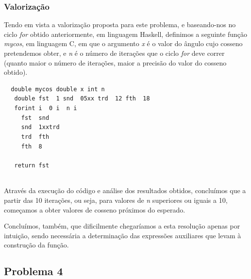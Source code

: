 \documentclass[a4paper]{article}
\begin{document}
\subsubsection*{Valorização}
\par\noindent\hspace{0.5cm}Tendo em vista a valorização proposta para este problema, e baseando-nos no ciclo \textit{for} obtido anteriormente, em linguagem Haskell, definimos a seguinte função \textit{mycos}, em linguagem C, em que o argumento \textit{x} é o valor do ângulo cujo cosseno pretendemos obter, e \textit{n} é o número de iterações que o ciclo \textit{for} deve correr (quanto maior o número de iterações, maior a precisão do valor do cosseno obtido).
\begin{tabbing}\tt
~double~mycos~double~x~int~n\\
\tt ~~~double~fst~~1~snd~~05xx~trd~~12~fth~~18\\
\tt ~~~forint~i~~0~i~~n~i\\
\tt ~~~~~fst~~snd\\
\tt ~~~~~snd~~1xxtrd\\
\tt ~~~~~trd~~fth\\
\tt ~~~~~fth~~8\\
\tt ~~~\\
\tt ~~~return~fst\\
\tt ~
\end{tabbing}
\par\noindent\hspace{0.5cm}Através da execução do código e análise dos resultados obtidos, concluímos que a partir das 10 iterações, ou seja, para valores de \textit{n} superiores ou iguais a 10, começamos a obter valores de cosseno próximos do esperado.
\par Concluímos, também, que dificilmente chegaríamos a esta resolução apenas por intuição, sendo necessária a determinação das expressões auxiliares que levam à construção da função.

\subsection*{Problema 4}
\end{document}
